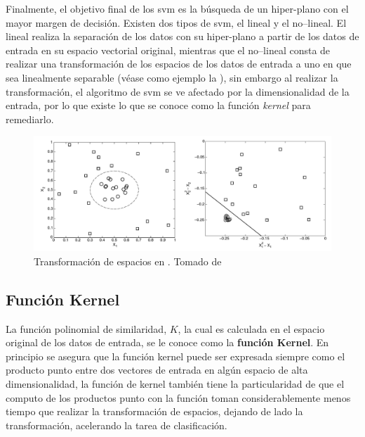 Finalmente, el objetivo final de los \gls{svm} es la búsqueda de un hiper-plano con el mayor margen de decisión. Existen dos tipos de \gls{svm}, el lineal y el no--lineal. El lineal realiza la separación de los datos con su hiper-plano a partir de los datos de entrada en su espacio vectorial original, mientras que el no--lineal consta de realizar una transformación de los espacios de los datos de entrada a uno en que sea linealmente separable (véase como ejemplo la ), sin embargo al realizar la transformación, el algoritmo de \gls{svm} se ve afectado por la dimensionalidad de la entrada, por lo que existe lo que se conoce como la función \emph{kernel} para remediarlo.

\begin{figure}[H]
\centering
\includegraphics[scale=0.25]{Figures/svm-nonlinear-transform.png}
\decoRule
\caption[Transformación de espacios en ]{Transformación de espacios en . Tomado de \cite{tan2005introduction}}
\label{fig:svm-nonlinear-transforms}
\end{figure}

\subsection{Función Kernel}
La función polinomial de similaridad, $K$, la cual es calculada en el espacio original de los datos de entrada, se le conoce como la \textbf{función Kernel}. En principio se asegura que la función kernel puede ser expresada siempre como el producto punto entre dos vectores de entrada en algún espacio de alta dimensionalidad, la función de kernel también tiene la particularidad de que el computo de los productos punto con la función toman considerablemente menos tiempo que realizar la transformación de espacios, dejando de lado la transformación, acelerando la tarea de clasificación.


